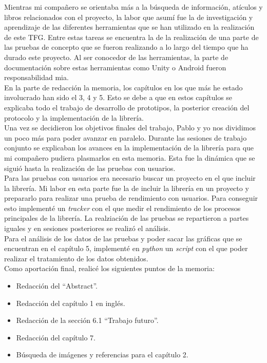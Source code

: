 Mientras mi compa\~nero se orientaba m\'as a la b\'usqueda de informaci\'on, at\'iculos y libros relacionados con el proyecto, la labor que asum\'i fue la de investigaci\'on y aprendizaje de las diferentes herramientas que se han utilizado en la realizaci\'on de este TFG. Entre estas tareas se encuentra la de la realizaci\'on de una parte de las pruebas de concepto que se fueron realizando a lo largo del tiempo que ha durado este proyecto. Al ser conocedor de las herramientas, la parte de documentaci\'on sobre estas herramientas como Unity o Android fueron responsabilidad mia.\\

En la parte de redacci\'on la memoria, los cap\'itulos en los que m\'as he estado involucrado han sido el 3, 4 y 5. Esto se debe a que en estos cap\'itulos se explicaba todo el trabajo de desarrollo de prototipos, la posterior creaci\'on del protocolo y la implementaci\'on de la librer\'ia.\\

Una vez se decidieron los objetivos finales del trabajo, Pablo y yo nos dividimos un poco m\'as para poder avanzar en paralelo. Durante las sesiones de trabajo conjunto se explicaban los avances en la implementaci\'on de la librer\'ia para que mi compa\~nero pudiera plasmarlos en esta memoria. Esta fue la din\'amica que se sigui\'o hasta la realizaci\'on de las pruebas con usuarios.\\

Para las pruebas con usuarios era necesario buscar un proyecto en el que incluir la librer\'ia. Mi labor en esta parte fue la de incluir la librer\'ia en un proyecto y prepararlo para realizar una prueba de rendimiento con usuarios. Para conseguir esto implement\'e un \textit{tracker} con el que medir el rendimiento de los procesos principales de la librer\'ia. La realziaci\'on de las pruebas se repartieron a partes iguales y en sesiones posteriores se realiz\'o el an\'alisis. \\

Para el an\'alisis de los datos de las pruebas y poder sacar las gr\'aficas que se encuentran en el cap\'itulo 5, implement\'e en \textit{python} un \textit{script} con el que poder realizar el tratamiento de los datos obtenidos.\\

Como aportaci\'on final, realic\'e los siguientes  puntos de la memoria:
\begin{itemize}
  \item  Redacci\'on del ``Abstract''.
  \item Redacci\'on del cap\'itulo 1 en ingl\'es.
\item Redacci\'on de la secci\'on 6.1 ``Trabajo futuro''.
\item Redacci\'on del cap\'itulo 7.
\item B\'usqueda de im\'agenes y referencias para el cap\'itulo 2.
\end{itemize}